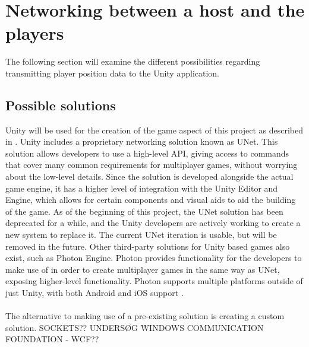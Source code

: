 \section{Networking between a host and the players}
The following section will examine the different possibilities regarding transmitting player position data to the Unity application.

\subsection{Possible solutions}
Unity will be used for the creation of the game aspect of this project as described in .
Unity includes a proprietary networking solution known as UNet\cite{unityunet}.
This solution allows developers to use a high-level API, giving access to commands that cover many common requirements for multiplayer games, without worrying about the low-level details.
Since the solution is developed alongside the actual game engine, it has a higher level of integration with the Unity Editor and Engine, which allows for certain components and visual aids to aid the building of the game.
As of the beginning of this project, the UNet solution has been deprecated for a while, and the Unity developers are actively working to create a new system to replace it.
The current UNet iteration is usable, but will be removed in the future.
Other third-party solutions for Unity based games also exist, such as Photon Engine.
Photon provides functionality for the developers to make use of in order to create multiplayer games in the same way as UNet, exposing higher-level functionality.
Photon supports multiple platforms outside of just Unity, with both Android and iOS support \cite{photonnet}.
\\\\
The alternative to making use of a pre-existing solution is creating a custom solution.
SOCKETS??
UNDERSØG WINDOWS COMMUNICATION FOUNDATION - WCF??
